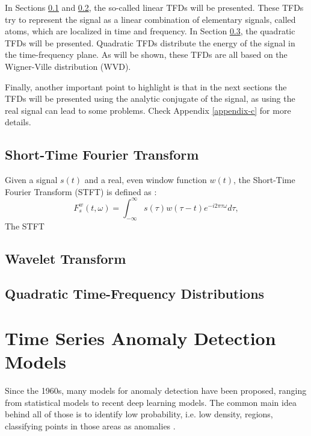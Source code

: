 In Sections \ref{sec-STFT} and \ref{sec-WT}, the so-called linear TFDs will be presented. These TFDs try to represent the signal as a linear combination of elementary signals, called atoms, which are localized in time and frequency. In Section \ref{sec-WVD}, the quadratic TFDs will be presented. Quadratic TFDs distribute the energy of the signal in the time-frequency plane. As will be shown, these TFDs are all based on the Wigner-Ville distribution (WVD).

Finally, another important point to highlight is that in the next sections the TFDs will be presented using the analytic conjugate of the signal, as using the real signal can lead to some problems. Check Appendix \ref{appendix-c} for more details.

\subsection{Short-Time Fourier Transform} \label{sec-STFT}

Given a signal $s(t)$ and a real, even window function $w(t)$, the Short-Time Fourier Transform (STFT) is defined as \cite{grochenig2001foundations}:
\begin{equation}
    F^{w}_{s}(t, \omega) = \int_{-\infty}^{\infty} s(\tau) w(\tau - t) e^{-i2\pi \tau \omega} d\tau,
\end{equation}
The STFT 

\subsection{Wavelet Transform} \label{sec-WT}


\subsection{Quadratic Time-Frequency Distributions} \label{sec-WVD}



\section{Time Series Anomaly Detection Models} \label{sec-model-basics}

Since the 1960s, many models for anomaly detection have been proposed, ranging from statistical models to recent deep learning models. The common main idea behind all of those is to identify low probability, i.e. low density, regions, classifying points in those areas as anomalies \cite{Samariya_Thakkar_2021}. 

